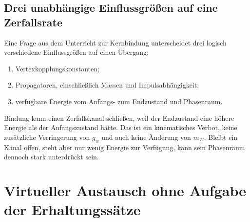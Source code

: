 \subsection{Drei unabhängige Einflussgrößen auf eine Zerfallsrate}

Eine Frage aus dem Unterricht zur Kernbindung unterscheidet drei logisch verschiedene Einflussgrößen auf einen Übergang:
\begin{enumerate}\item Vertexkopplungskonstanten;
\item Propagatoren, einschließlich Massen und Impulsabhängigkeit;
\item verfügbare Energie vom Anfangs- zum Endzustand und Phasenraum.
\end{enumerate}
Bindung kann einen Zerfallskanal schließen, weil der Endzustand eine höhere Energie als der Anfangszustand hätte. Das ist ein kinematisches Verbot, keine zusätzliche Verringerung von \(g_w\) und auch keine Änderung von \(m_W\). Bleibt ein Kanal offen, steht aber nur wenig Energie zur Verfügung, kann sein Phasenraum dennoch stark unterdrückt sein.

\begin{classroomqa}\end{classroomqa}

\begin{classroomqa}\end{classroomqa}

\section{Virtueller Austausch ohne Aufgabe der Erhaltungssätze}

